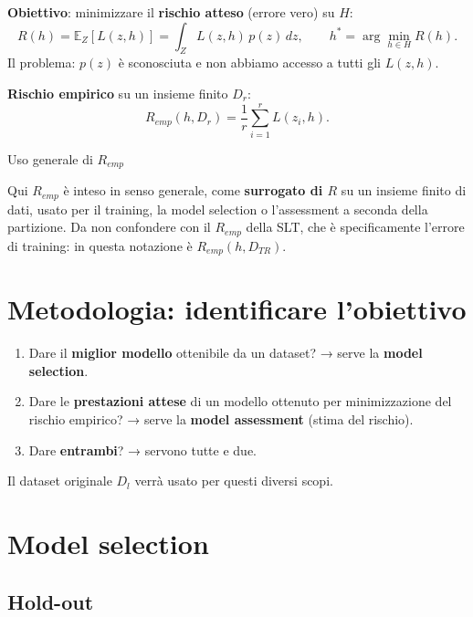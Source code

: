 \textbf{Obiettivo}: minimizzare il \textbf{rischio atteso} (errore vero)
su \(H\): \[
R(h) = \mathbb{E}_Z[L(z, h)] = \int_Z L(z, h)\,p(z)\,dz, \qquad h^* = \arg\min_{h \in H} R(h).
\] Il problema: \(p(z)\) è sconosciuta e non abbiamo accesso a tutti gli
\(L(z,h)\).

\textbf{Rischio empirico} su un insieme finito \(D_r\): \[
R_{emp}(h, D_r) = \frac{1}{r}\sum_{i=1}^{r} L(z_i, h).
\]

\begin{boxwarning}{Uso generale di \(R_{emp}\)}

Qui \(R_{emp}\) è inteso in senso generale, come \textbf{surrogato di
\(R\)} su un insieme finito di dati, usato per il training, la model
selection o l'assessment a seconda della partizione. Da non confondere
con il \(R_{emp}\) della SLT, che è specificamente l'errore di training:
in questa notazione è \(R_{emp}(h, D_{TR})\).

\end{boxwarning}

\section{Metodologia: identificare
l'obiettivo}\label{metodologia-identificare-lobiettivo}

\begin{enumerate}
\def\labelenumi{\arabic{enumi}.}
\tightlist
\item
  Dare il \textbf{miglior modello} ottenibile da un dataset? → serve la
  \textbf{model selection}.
\item
  Dare le \textbf{prestazioni attese} di un modello ottenuto per
  minimizzazione del rischio empirico? → serve la \textbf{model
  assessment} (stima del rischio).
\item
  Dare \textbf{entrambi}? → servono tutte e due.
\end{enumerate}

Il dataset originale \(D_l\) verrà usato per questi diversi scopi.

\section{Model selection}\label{model-selection}

\subsection{Hold-out}\label{hold-out}

